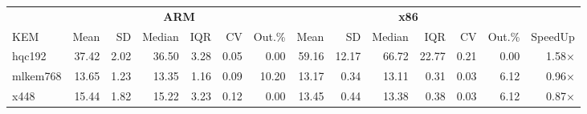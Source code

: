 \begin{table}[!ht]
\centering
\begin{tabular}{l|rrrrrr|rrrrrr|r}
\toprule
& \multicolumn{6}{c}{\bfseries ARM} & \multicolumn{6}{c}{\bfseries x86} & \\
\cmidrule(lr){2-7} \cmidrule(lr){8-13}
KEM & Mean & SD & Median & IQR & CV & Out.\% & Mean & SD & Median & IQR & CV & Out.\% & SpeedUp \\
\midrule
hqc192 & 37.42 & 2.02 & 36.50 & 3.28 & 0.05 & 0.00 & 59.16 & 12.17 & 66.72 & 22.77 & 0.21 & 0.00 & 1.58× \\
mlkem768 & 13.65 & 1.23 & 13.35 & 1.16 & 0.09 & 10.20 & 13.17 & 0.34 & 13.11 & 0.31 & 0.03 & 6.12 & 0.96× \\
x448 & 15.44 & 1.82 & 15.22 & 3.23 & 0.12 & 0.00 & 13.45 & 0.44 & 13.38 & 0.38 & 0.03 & 6.12 & 0.87× \\
\bottomrule
\end{tabular}
\end{table}
